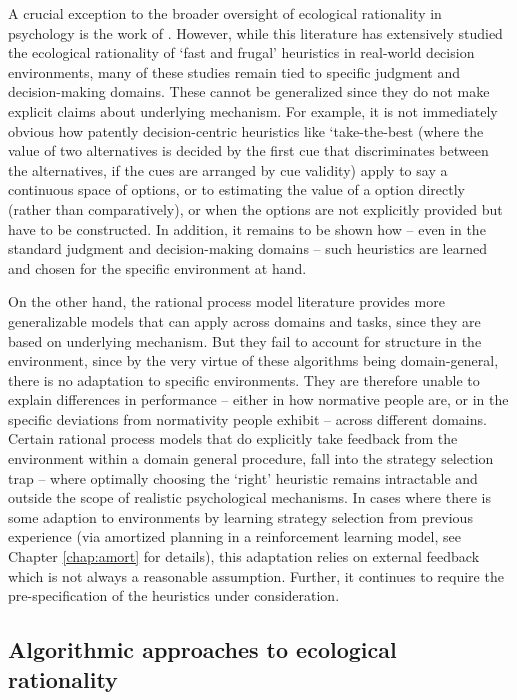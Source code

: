 A crucial exception to the broader oversight of ecological rationality in psychology is the work of \citep{gigerenzer2008heuristics}. However, while this literature has extensively studied the ecological rationality of `fast and frugal' heuristics in real-world decision environments, many of these studies remain tied to specific judgment and decision-making domains. These cannot be generalized since they do not make explicit claims about underlying mechanism. For example, it is not immediately obvious how patently decision-centric heuristics like `take-the-best (where the value of two alternatives is decided by the first cue that discriminates between the alternatives, if the cues are arranged by cue validity) apply to say a continuous space of options, or to estimating the value of a option directly (rather than comparatively), or when the options are not explicitly provided but have to be constructed. In addition, it remains to be shown how -- even in the standard judgment and decision-making domains -- such heuristics are learned and chosen for the specific environment at hand. 

On the other hand, the rational process model literature provides more generalizable models that can apply across domains and tasks, since they are based on underlying mechanism. But they fail to account for structure in the environment, since by the very virtue of these algorithms being domain-general, there is no adaptation to specific environments. They are therefore unable to explain differences in performance -- either in how normative people are, or in the specific deviations from normativity people exhibit -- across different domains. Certain rational process models that do explicitly take feedback from the environment within a domain general procedure, fall into the strategy selection trap -- where optimally choosing the `right' heuristic remains intractable and outside the scope of realistic psychological mechanisms. In cases where there is some adaption to environments by learning strategy selection from previous experience (via amortized planning in a reinforcement learning model, see Chapter \ref{chap:amort} for details), this adaptation relies on external feedback which is not always a reasonable assumption. Further, it continues to require the pre-specification of the heuristics under consideration.

\subsection{Algorithmic approaches to ecological rationality}

